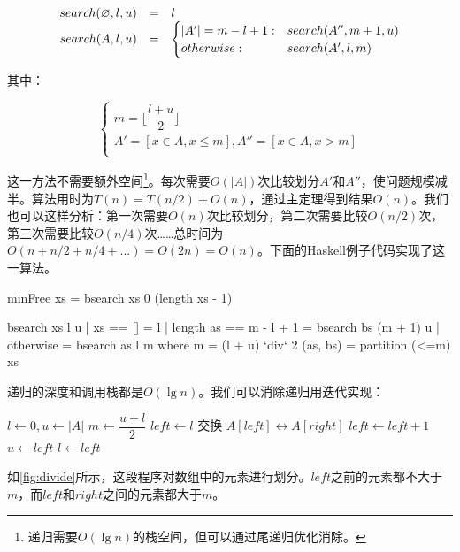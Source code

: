 \documentclass[b5paper]{ctexart}
\begin{document}
\[
\begin{array}{rcl}
search(\varnothing, l, u) & = & l \\
search(A, l, u) & = & \begin{cases}
       |A'| = m - l + 1 : & search(A'', m+1, u) \\
       otherwise : & search(A',  l, m) \\
\end{cases}
\end{array}
\]

其中：

\[
\begin{cases}
m = \lfloor \dfrac{l + u}{2} \rfloor \\
A' = [x \in A, x \leq m ], A'' = [x \in A, x > m ] \\
\end{cases}
\]

这一方法不需要额外空间\footnote{递归需要$O(\lg n)$的栈空间，但可以通过尾递归优化消除。}。每次需要$O(|A|)$次比较划分$A'$和$A''$，使问题规模减半。算法用时为$T(n) = T(n/2) + O(n)$，通过主定理得到结果$O(n)$。我们也可以这样分析：第一次需要$O(n)$次比较划分，第二次需要比较$O(n/2)$次，第三次需要比较$O(n/4)$次……总时间为$O(n + n/2 + n/4 + ...) = O(2n) = O(n)$。下面的Haskell例子代码实现了这一算法。

\lstset{frame = single}
\begin{Haskell}
minFree xs = bsearch xs 0 (length xs - 1)

bsearch xs l u | xs == [] = l
               | length as == m - l + 1 = bsearch bs (m + 1) u
               | otherwise = bsearch as l m
    where
      m = (l + u) `div` 2
      (as, bs) = partition (<=m) xs
\end{Haskell}

递归的深度和调用栈都是$O(\lg n)$。我们可以消除递归用迭代实现：

\begin{algorithmic}[1]
  \State $l \gets 0, u \gets |A|$
    \State $m \gets \dfrac{u + l}{2}$
    \State $left \gets l$
        \State 交换 $A[left] \leftrightarrow A[right]$
        \State $left \gets left + 1$
      \EndIf
    \EndFor
      \State $u \gets left$
    \Else
      \State $l \gets left$
    \EndIf
  \EndWhile
\EndFunction
\end{algorithmic}

如\cref{fig:divide}所示，这段程序对数组中的元素进行划分。$left$之前的元素都不大于$m$，而$left$和$right$之间的元素都大于$m$。
\end{document}
